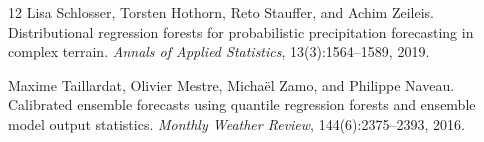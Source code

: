 \documentclass[11pt]{article}
\begin{document}
\begin{thebibliography}{12}
Lisa Schlosser, Torsten Hothorn, Reto Stauffer, and Achim Zeileis.
\newblock Distributional regression forests for probabilistic precipitation forecasting in complex terrain.
\newblock \emph{Annals of Applied Statistics}, 13(3):1564--1589, 2019.

Maxime Taillardat, Olivier Mestre, Micha\"el Zamo, and Philippe Naveau.
\newblock Calibrated ensemble forecasts using quantile regression forests and ensemble model output statistics.
\newblock \emph{Monthly Weather Review}, 144(6):2375--2393, 2016.

\end{thebibliography}
\end{document}
